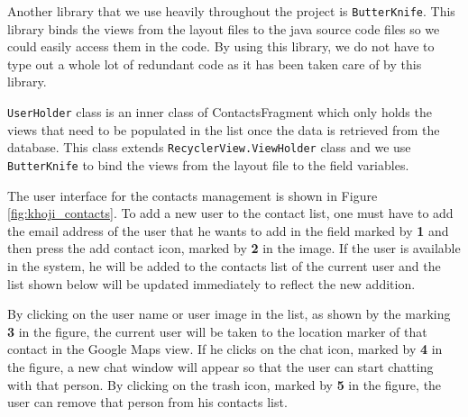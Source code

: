 Another library that we use heavily throughout the project is \texttt{ButterKnife}. This library binds the views from the layout files to the java source code files so we could easily access them in the code. By using this library, we do not have to type out a whole lot of redundant code as it has been taken care of by this library.

\texttt{UserHolder} class is an inner class of ContactsFragment which only holds the views that need to be populated in the list once the data is retrieved from the database. This class extends \texttt{RecyclerView.ViewHolder} class and we use \texttt{ButterKnife} to bind the views from the layout file to the field variables.

The user interface for the contacts management is shown in Figure \ref{fig:khoji_contacts}. To add a new user to the contact list, one must have to add the email address of the user that he wants to add in the field marked by \textbf{1} and then press the add contact icon, marked by \textbf{2} in the image. If the user is available in the system, he will be added to the contacts list of the current user and the list shown below will be updated immediately to reflect the new addition.

By clicking on the user name or user image in the list, as shown by the marking \textbf{3} in the figure, the current user will be taken to the location marker of that contact in the Google Maps view. If he clicks on the chat icon, marked by \textbf{4} in the figure, a new chat window will appear so that the user can start chatting with that person. By clicking on the trash icon, marked by \textbf{5} in the figure, the user can remove that person from his contacts list.

